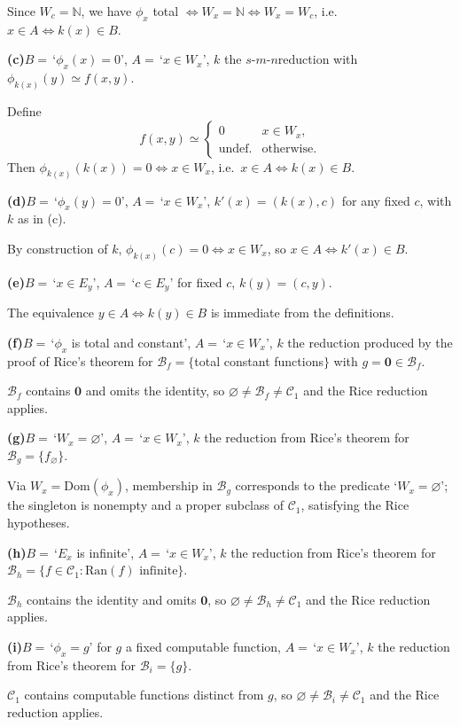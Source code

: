 \documentclass[fleqn]{article}
\newcommand{\SMN}{$s$\nobreakdash-$m$\nobreakdash-$n$}
\begin{document}
Since $W_c = \mathbb{N}$, we have $\phi_x$ total $\iff W_x = \mathbb{N} \iff W_x = W_c$, i.e.\ $x \in A \iff k(x) \in B$.

\medskip

\noindent\textbf{(c)}\quad $B = \,$`$\phi_x(x) = 0$', $A = \,$`$x \in W_x$', $k$ the \SMN reduction with $\phi_{k(x)}(y) \simeq f(x, y)$.

Define
\[
f(x, y) \simeq \begin{cases} 0 & x \in W_x, \\ \text{undef.} & \text{otherwise.} \end{cases}
\]
Then $\phi_{k(x)}(k(x)) = 0 \iff x \in W_x$, i.e.\ $x \in A \iff k(x) \in B$.

\medskip

\noindent\textbf{(d)}\quad $B = \,$`$\phi_x(y) = 0$', $A = \,$`$x \in W_x$', $k'(x) = (k(x), c)$ for any fixed $c$, with $k$ as in (c).

By construction of $k$, $\phi_{k(x)}(c) = 0 \iff x \in W_x$, so $x \in A \iff k'(x) \in B$.

\medskip

\noindent\textbf{(e)}\quad $B = \,$`$x \in E_y$', $A = \,$`$c \in E_y$' for fixed $c$, $k(y) = (c, y)$.

The equivalence $y \in A \iff k(y) \in B$ is immediate from the definitions.

\medskip

\noindent\textbf{(f)}\quad $B = \,$`$\phi_x$ is total and constant', $A = \,$`$x \in W_x$', $k$ the reduction produced by the proof of Rice's theorem for $\mathscr{B}_f = \{$total constant functions$\}$ with $g = \mathbf{0} \in \mathscr{B}_f$.

$\mathscr{B}_f$ contains $\mathbf{0}$ and omits the identity, so $\varnothing \neq \mathscr{B}_f \neq \mathscr{C}_1$ and the Rice reduction applies.

\medskip

\noindent\textbf{(g)}\quad $B = \,$`$W_x = \varnothing$', $A = \,$`$x \in W_x$', $k$ the reduction from Rice's theorem for $\mathscr{B}_g = \{ f_\varnothing \}$.

Via $W_x = \mathrm{Dom}(\phi_x)$, membership in $\mathscr{B}_g$ corresponds to the predicate `$W_x = \varnothing$'; the singleton is nonempty and a proper subclass of $\mathscr{C}_1$, satisfying the Rice hypotheses.

\medskip

\noindent\textbf{(h)}\quad $B = \,$`$E_x$ is infinite', $A = \,$`$x \in W_x$', $k$ the reduction from Rice's theorem for $\mathscr{B}_h = \{ f \in \mathscr{C}_1 : \mathrm{Ran}(f) \text{ infinite} \}$.

$\mathscr{B}_h$ contains the identity and omits $\mathbf{0}$, so $\varnothing \neq \mathscr{B}_h \neq \mathscr{C}_1$ and the Rice reduction applies.

\medskip

\noindent\textbf{(i)}\quad $B = \,$`$\phi_x = g$' for $g$ a fixed computable function, $A = \,$`$x \in W_x$', $k$ the reduction from Rice's theorem for $\mathscr{B}_i = \{g\}$.

$\mathscr{C}_1$ contains computable functions distinct from $g$, so $\varnothing \neq \mathscr{B}_i \neq \mathscr{C}_1$ and the Rice reduction applies.
\end{document}
